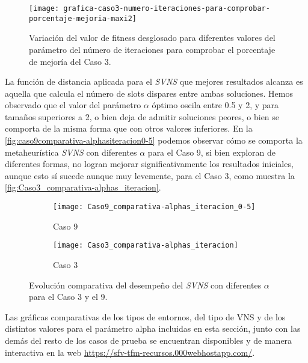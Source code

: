 \begin{figure}
	\centering
	\texttt{[image: grafica-caso3-numero-iteraciones-para-comprobar-porcentaje-mejoria-maxi2]}
	\caption{Variación del valor de fitness desglosado para diferentes valores del parámetro del número de iteraciones para comprobar el porcentaje de mejoría del Caso 3.}
	\label{fig:5:caso3-numero-iteraciones-para-comprobar-porcentaje-mejoria}
\end{figure}




La función de distancia aplicada para el \textit{SVNS} que mejores resultados alcanza es aquella que calcula el número de slots dispares entre ambas soluciones. Hemos observado que el valor del parámetro $\alpha$ óptimo oscila entre 0.5 y 2, y para tamaños superiores a 2, o bien deja de admitir soluciones peores, o bien se comporta de la misma forma que con otros valores inferiores. En la \autoref{fig:caso9comparativa-alphasiteracion0-5} podemos observar cómo se comporta la metaheurística \textit{SVNS} con diferentes $\alpha$ para el Caso 9, si bien exploran de diferentes formas, no logran mejorar significativamente los resultados iniciales, aunque esto sí sucede aunque muy levemente, para el Caso 3, como muestra la \autoref{fig:Caso3_comparativa-alphas_iteracion}.

\begin{figure}
	\begin{subfigure}{\linewidth}
	\texttt{[image: Caso9\_comparativa-alphas\_iteracion\_0-5]}
	\caption{Caso 9}
	\label{fig:caso9comparativa-alphasiteracion0-5}
	\centering
	\end{subfigure}

	\begin{subfigure}{\linewidth}
	\texttt{[image: Caso3\_comparativa-alphas\_iteracion]}
	\caption{Caso 3}
	\label{fig:Caso3_comparativa-alphas_iteracion}
	\centering
\end{subfigure}
	\caption{Evolución comparativa del desempeño del \textit{SVNS} con diferentes \textbf{$\alpha$} para el Caso 3 y el 9.}
\end{figure}

Las gráficas comparativas de los tipos de entornos, del tipo de VNS y de los distintos valores para el parámetro alpha incluidas en esta sección, junto con las demás del resto de los casos de prueba se encuentran disponibles y de manera interactiva en la web \url{https://sfv-tfm-recursos.000webhostapp.com/}.


%
%

